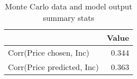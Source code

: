 \begin{table}[!ht]
	\centering
		\caption{Monte Carlo data and model output summary stats}
\begin{tabular}{lr}
		\toprule
               &     Value\\
		\midrule
		Corr(Price chosen, Inc)&     0.344\\
		Corr(Price predicted, Inc)&     0.363\\
		\bottomrule
	\end{tabular}
\end{table}
